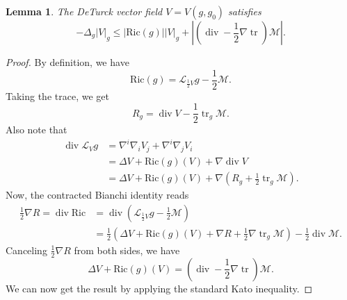 \documentclass[12pt]{amsart}
\newcommand{\calM}{\mathcal{M}}
\newcommand{\calL}{{\mathcal L}}
\renewcommand{\1}{{\mathbf 1}}
\newcommand{\Ric}{\mathrm{Ric}}
\renewcommand{\div}{{\operatorname{div} }}
\newcommand{\tr}{{\operatorname{tr}}}
\newtheorem{lemma}[thm]{Lemma}
\theoremstyle{others}
\numberwithin{equation}{section}
\begin{document}
\begin{lemma}\label{lemma:ellipticdeTurck}
    The DeTurck vector field $V = V(g,g_0)$ satisfies
    \begin{equation*}
        -\Delta_g |V|_g \leq |\Ric(g)||V|_g + \left|\left( \div - \frac12 \nabla \tr \right) \calM \right|.
    \end{equation*}
\end{lemma}
\begin{proof}
    By definition, we have
    $$\Ric(g) = \calL_{\frac12 V} g - \frac12 \calM.$$
    Taking the trace, we get
    $$R_g = \div V - \frac12 \tr_g \calM.$$
    Also note that
    \begin{equation*}
    \begin{split}
        \div \calL_V g & = \nabla^i \nabla_i V_j + \nabla^i \nabla_j V_i \\
        & = \Delta V + \Ric(g)(V) + \nabla \div V \\
        & = \Delta V + \Ric(g)(V) + \nabla \left( R_g + \frac12 \tr_g \calM \right).
        \end{split}
    \end{equation*}
Now, the contracted Bianchi identity reads
\begin{equation*}
\begin{split}
    \frac12 \nabla R = \div \Ric & = \div \left(\calL_{\frac12 V} g - \frac12 \calM \right) \\
    & = \frac12 \left( \Delta V + \Ric(g)(V) + \nabla R + \frac12 \nabla \tr_g \calM\right) - \frac12 \div \calM.
    \end{split}
\end{equation*}
Canceling $\frac12 \nabla R$ from both sides, we have
\begin{equation}\label{Vequation}
    \Delta V + \Ric(g)(V) = \left( \div - \frac12 \nabla \tr \right) \calM.
\end{equation}
We can now get the result by applying the standard Kato inequality.
\end{proof}
\end{document}
